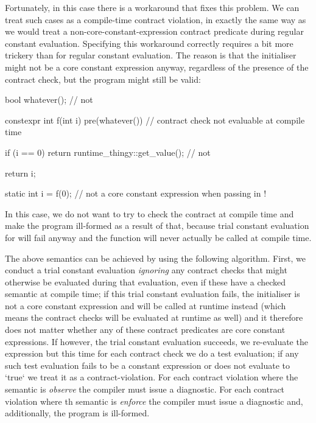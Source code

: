 Fortunately, in this case there is a workaround that fixes this problem. We can treat such cases as a compile-time contract violation, in exactly the same way as we would treat a non-core-constant-expression contract predicate during regular constant evaluation. Specifying this workaround correctly requires a bit more trickery than for regular constant evaluation. The reason is that the initialiser might not be a core constant expression anyway, regardless of the presence of the contract check, but the program might still be valid:

\begin{codeblock}
bool whatever();     // not 

constexpr int f(int i)
  pre(whatever())  // contract check not evaluable at compile time
{
  if (i == 0)
    return runtime_thingy::get_value();  // not 

  return i;
}

static int i = f(0);  // not a core constant expression when passing in !
\end{codeblock}

In this case, we do not want to try to check the contract at compile time and make the program ill-formed as a result of that, because trial constant evaluation for  will fail anyway and the function will never actually be called at compile time.

The above semantics can be achieved by using the following algorithm. First, we conduct a trial constant evaluation \emph{ignoring} any contract checks that might otherwise be evaluated during that evaluation, even if these have a checked semantic at compile time; if this trial constant evaluation fails, the initialiser is not a core constant expression and will be called at runtime instead (which means the contract checks will be evaluated at runtime as well) and it therefore does not matter whether any of these contract predicates are core constant expressions. If however, the trial constant evaluation succeeds, we re-evaluate the expression but this time for each contract check we do a test evaluation; if any such test evaluation fails to be a constant expression or does not evaluate to `true` we treat it as a contract-violation.   For each contract violation where the semantic is \emph{observe} the compiler must issue a diagnostic.   For each contract violation where th semantic is \emph{enforce} the compiler must issue a diagnostic and, additionally, the program is ill-formed.

